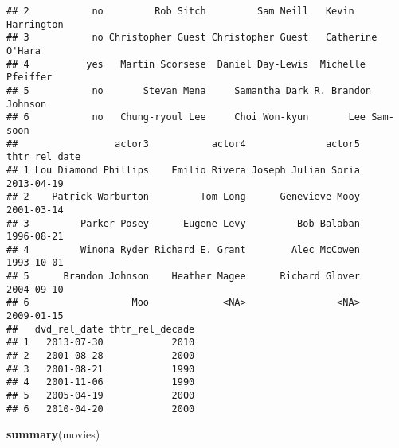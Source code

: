 \documentclass[]{article}
\newenvironment{Shaded}{\begin{snugshade}}{\end{snugshade}}
\newcommand{\KeywordTok}[1]{\textcolor[rgb]{0.13,0.29,0.53}{\textbf{#1}}}
\newcommand{\NormalTok}[1]{#1}
\begin{document}
\begin{verbatim}
## 2           no         Rob Sitch         Sam Neill   Kevin Harrington
## 3           no Christopher Guest Christopher Guest   Catherine O'Hara
## 4          yes   Martin Scorsese  Daniel Day-Lewis  Michelle Pfeiffer
## 5           no       Stevan Mena     Samantha Dark R. Brandon Johnson
## 6           no   Chung-ryoul Lee     Choi Won-kyun       Lee Sam-soon
##                 actor3           actor4              actor5 thtr_rel_date
## 1 Lou Diamond Phillips    Emilio Rivera Joseph Julian Soria    2013-04-19
## 2    Patrick Warburton         Tom Long      Genevieve Mooy    2001-03-14
## 3         Parker Posey      Eugene Levy         Bob Balaban    1996-08-21
## 4         Winona Ryder Richard E. Grant        Alec McCowen    1993-10-01
## 5      Brandon Johnson    Heather Magee      Richard Glover    2004-09-10
## 6                  Moo             <NA>                <NA>    2009-01-15
##   dvd_rel_date thtr_rel_decade
## 1   2013-07-30            2010
## 2   2001-08-28            2000
## 3   2001-08-21            1990
## 4   2001-11-06            1990
## 5   2005-04-19            2000
## 6   2010-04-20            2000
\end{verbatim}

\begin{Shaded}
\begin{Highlighting}[]
\KeywordTok{summary}\NormalTok{(movies)}
\end{Highlighting}
\end{Shaded}
\end{document}
